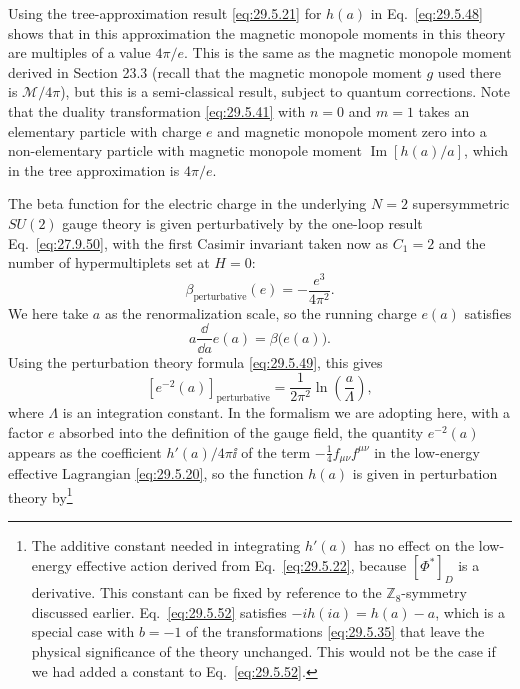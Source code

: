 Using the tree-approximation result \eqref{eq:29.5.21} for \(h(a)\) in
Eq.~\eqref{eq:29.5.48} shows that in this approximation the magnetic
monopole moments in this theory are multiples of a value \(4\pi/e\). This is
the same as the magnetic monopole moment derived in Section 23.3 (recall that
the magnetic monopole moment \(g\) used there is \(\mathcal{M}/4\pi\)), but
this is a semi-classical result, subject to quantum corrections. Note that
the duality transformation \eqref{eq:29.5.41} with \(n=0\) and \(m=1\)
takes an elementary particle with charge \(e\) and magnetic monopole moment
zero into a non-elementary particle with magnetic monopole moment
\(\operatorname{Im}[h(a)/a]\), which in the tree approximation is \(4\pi/e\).

The beta function for the electric charge in the underlying \(N=2\)
supersymmetric \(SU(2)\) gauge theory is given perturbatively by the one-loop
result Eq.~\eqref{eq:27.9.50}, with the first Casimir invariant taken now as
\(C_1=2\) and the number of hypermultiplets set at \(H=0\):
\begin{equation}
  \beta_{\mathrm{perturbative}}(e)=-\frac{e^3}{4\pi^2}.
  \tag{29.5.49}\label{eq:29.5.49}
\end{equation}
We here take \(a\) as the renormalization scale, so the running charge
\(e(a)\) satisfies
\begin{equation}
  a\frac{\dd}{\dd a}e(a)=\beta\bigl(e(a)\bigr).
  \tag{29.5.50}\label{eq:29.5.50}
\end{equation}
Using the perturbation theory formula \eqref{eq:29.5.49}, this gives
\begin{equation}
  \left[e^{-2}(a)\right]_{\mathrm{perturbative}}
  =\frac{1}{2\pi^2}\ln\left(\frac{a}{\Lambda}\right),
  \tag{29.5.51}\label{eq:29.5.51}
\end{equation}
where \(\Lambda\) is an integration constant. In the formalism we are
adopting here, with a factor \(e\) absorbed into the definition of the gauge
field, the quantity \(e^{-2}(a)\) appears as the coefficient \(h'(a)/4\pi \ii\)
of the term \(-\tfrac14f_{\mu\nu}f^{\mu\nu}\) in the low-energy effective
Lagrangian \eqref{eq:29.5.20}, so the function \(h(a)\) is
given in perturbation theory by\footnote{The additive constant needed in
integrating \(h'(a)\) has no effect on the low-energy effective action
derived from Eq.~\eqref{eq:29.5.22}, because \([\Phi^*]_D\) is a derivative.
This constant can be fixed by reference to the \(\mathbb{Z}_8\)-symmetry
discussed earlier. Eq.~\eqref{eq:29.5.52} satisfies
\(-ih(ia)=h(a)-a\), which is a special case with \(b=-1\) of the
transformations \eqref{eq:29.5.35} that leave the physical significance of
the theory unchanged. This would not be the case if we had added a constant
to Eq.~\eqref{eq:29.5.52}.}
